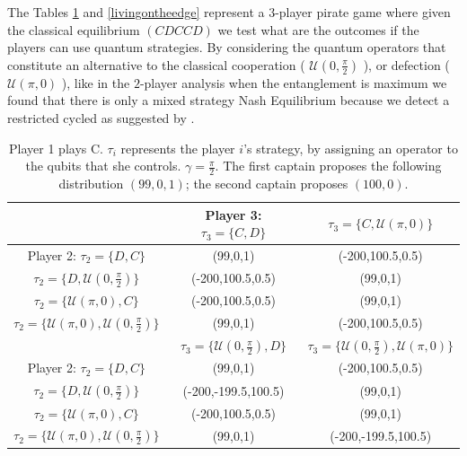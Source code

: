 \documentclass[10pt,twocolumn]{llncs}
\begin{document}
The Tables \ref{iamlivingontheedge} and \ref{livingontheedge} represent a $3$-player pirate game where given the classical equilibrium $(CDCCD)$ we test what are the outcomes if the players can use quantum strategies. By considering the quantum operators that constitute an alternative to the classical cooperation ( $\mathcal{U}( 0, \frac{\pi}{2})$ ), or defection ( $\mathcal{U}( \pi, 0)$ ), like in the $2$-player analysis when the entanglement is maximum we found that there is only a mixed strategy Nash Equilibrium because we detect a restricted cycled as suggested by \cite{Du}. 



\begin{center}
\begin{table}
\begin{centering}
\begin{tabular}{ccc}
\hline 
 & Player 3: $\tau_{3}=\{C,D\}$ &  $\tau_{3}=\{C,\mathcal{U}(\pi,0)\}$\tabularnewline
\hline 
Player 2: $\tau_{2}=\{D,C\}$ & (99,0,1) & (-200,100.5,0.5)\tabularnewline
$\tau_{2}=\{D,\mathcal{U}(0,\frac{\pi}{2})\}$ & (-200,100.5,0.5) & (99,0,1)\tabularnewline
$\tau_{2}=\{\mathcal{U}(\pi,0),C\}$ & (-200,100.5,0.5) & (99,0,1)\tabularnewline
$\tau_{2}=\{\mathcal{U}(\pi,0),\mathcal{U}(0,\frac{\pi}{2})\}$ & (99,0,1) & (-200,100.5,0.5)\tabularnewline
\hline 
\hline 
 & $\tau_{3}=\{\mathcal{U}(0,\frac{\pi}{2}),D\}$ & $\tau_{3}=\{\mathcal{U}(0,\frac{\pi}{2}),\mathcal{U}(\pi,0)\}$\tabularnewline
Player 2: $\tau_{2}=\{D,C\}$ & (99,0,1) & (-200,100.5,0.5)\tabularnewline
$\tau_{2}=\{D,\mathcal{U}(0,\frac{\pi}{2})\}$ & (-200,-199.5,100.5) & (99,0,1)\tabularnewline
$\tau_{2}=\{\mathcal{U}(\pi,0),C\}$ & (-200,100.5,0.5) & (99,0,1)\tabularnewline
$\tau_{2}=\{\mathcal{U}(\pi,0),\mathcal{U}(0,\frac{\pi}{2})\}$ & (99,0,1) & (-200,-199.5,100.5)\tabularnewline
\end{tabular}
\par\end{centering}
\caption{Player 1 plays C. $\tau_{i}$ represents the player $i$'s strategy, by assigning an operator to the qubits that she controls. $\gamma=\frac{\pi}{2}$. The first captain proposes the following distribution $(99,0,1)$; the second captain proposes $(100,0)$. }
\label{iamlivingontheedge}
\end{table}

\par\end{center}
\end{document}
